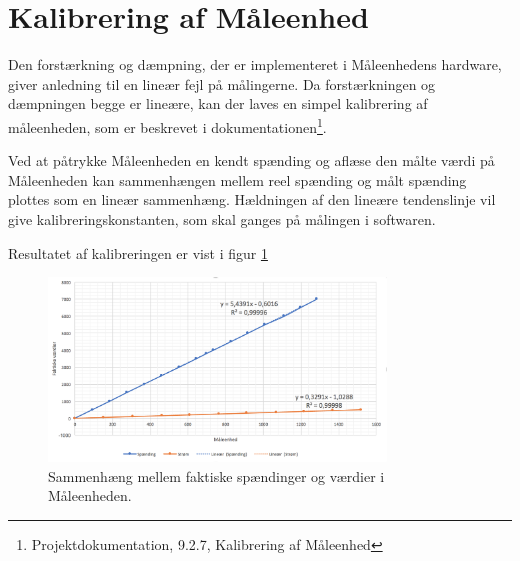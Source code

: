 
\section{Kalibrering af Måleenhed}

Den forstærkning og dæmpning, der er implementeret i Måleenhedens hardware, giver anledning til en lineær fejl på målingerne. Da forstærkningen og dæmpningen begge er lineære, kan der laves en simpel kalibrering af måleenheden, som er beskrevet i dokumentationen\footnote{Projektdokumentation, 9.2.7, Kalibrering af Måleenhed}.\newline

Ved at påtrykke Måleenheden en kendt spænding og aflæse den målte værdi på Måleenheden kan sammenhængen mellem reel spænding og målt spænding plottes som en lineær sammenhæng. Hældningen af den lineære tendenslinje vil give kalibreringskonstanten, som skal ganges på målingen i softwaren. 

Resultatet af kalibreringen er vist i figur \ref{fig:MEgraf}

\begin{figure}[H]
	\centering
	\includegraphics[width=0.80\textwidth]{figure/MEkalibreringgraf}
	\caption{Sammenhæng mellem faktiske spændinger og værdier i Måleenheden.}
	\label{fig:MEgraf}
\end{figure}